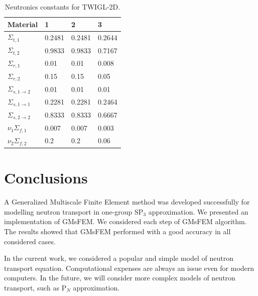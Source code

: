\documentclass[authoryear]{elsarticle}
\begin{document}
\begin{table}[ht]
\caption{\label{table:coeff}Neutronics constants for TWIGL-2D.}
	\label{t2}
	\begin{center}
	\begin{tabular}{l l l l}
		\hline
		Material & 1 & 2 & 3\\
		\hline 
		$\Sigma_{t,1}$				& 0.2481 & 0.2481 & 0.2644 \\
		$\Sigma_{t,2}$				& 0.9833 & 0.9833 & 0.7167 \\
		$\Sigma_{r,1}$				& 0.01   & 0.01   & 0.008  \\
		$\Sigma_{r,2}$				& 0.15   & 0.15   & 0.05   \\
		$\Sigma_{s,1\rightarrow2}$ 	& 0.01   & 0.01   & 0.01   \\
		$\Sigma_{s,1\rightarrow1}$	& 0.2281 & 0.2281 & 0.2464 \\
		$\Sigma_{s,2\rightarrow2}$	& 0.8333 & 0.8333 & 0.6667 \\
		$\nu_1\Sigma_{f,1}$			& 0.007  & 0.007  & 0.003  \\
		$\nu_2\Sigma_{f,2}$			& 0.2    & 0.2    & 0.06   \\
		\hline
	\end{tabular}
	\end{center}
\end{table}

\section{Conclusions}
A Generalized Multiscale Finite Element method was developed successfully for modelling neutron transport in one-group SP$_3$ approximation.  
We presented an implementation of GMsFEM. 
We considered each step of GMsFEM algorithm.
The results showed that GMsFEM performed with a good accuracy in all considered cases.

In the current work, we considered a popular and simple model of neutron transport equation.
Computational expenses are always an issue even for modern computers.
In the future, we will consider more complex models of neutron transport, such as P$_N$ approximation. 

\end{document}
